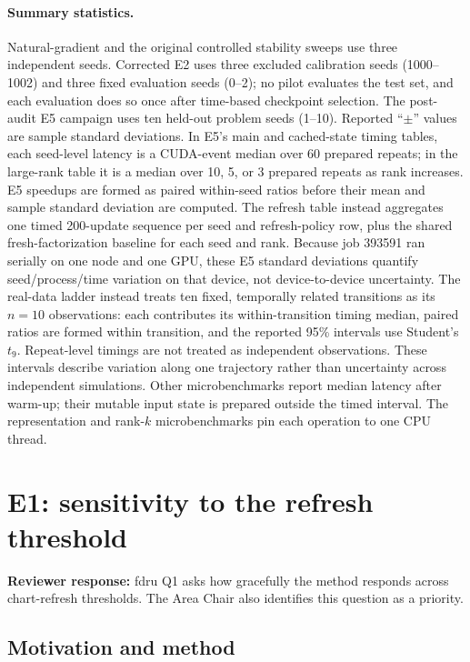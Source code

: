 \documentclass[11pt]{article}
\newcommand{\reviewer}[1]{\textbf{Reviewer response:} #1}
\begin{document}
\paragraph{Summary statistics.}
Natural-gradient and the original controlled stability sweeps use three
independent seeds.  Corrected E2 uses three excluded calibration seeds
(1000--1002) and three fixed evaluation seeds (0--2); no pilot evaluates the
test set, and each evaluation does so once after time-based checkpoint
selection.  The post-audit E5 campaign uses ten held-out problem seeds
(1--10).  Reported ``\(\pm\)'' values are sample standard deviations.  In
E5's main and cached-state timing tables, each seed-level latency is a
CUDA-event median over 60 prepared repeats; in the large-rank table it is a
median over 10, 5, or 3 prepared repeats as rank increases.  E5 speedups are
formed as paired within-seed ratios before their mean and sample standard
deviation are computed.  The refresh table instead aggregates one timed
200-update sequence per seed and refresh-policy row, plus the shared
fresh-factorization baseline for each seed and rank.  Because job 393591 ran
serially on one node and one GPU, these E5 standard deviations quantify
seed/process/time variation on that device, not device-to-device uncertainty.
The real-data ladder instead treats ten fixed, temporally related transitions
as its \(n=10\) observations: each contributes its within-transition timing
median, paired ratios are formed within transition, and the reported 95\%
intervals use Student's \(t_9\).  Repeat-level timings are not treated as
independent observations.  These intervals describe variation along one
trajectory rather than uncertainty across independent simulations.
Other microbenchmarks report median latency after warm-up; their mutable input
state is prepared outside the timed interval.  The representation and
rank-\(k\) microbenchmarks pin each operation to one CPU thread.

\section{E1: sensitivity to the refresh threshold}
\label{sec:e1}

\reviewer{fdru Q1 asks how gracefully the method responds across chart-refresh
thresholds.  The Area Chair also identifies this question as a priority.}

\subsection{Motivation and method}
\end{document}
